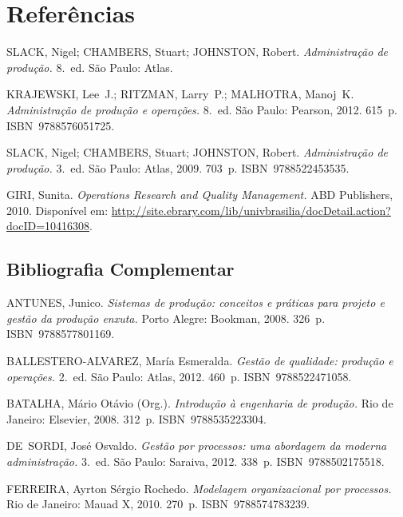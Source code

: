 \documentclass[12pt, a4paper]{article}
\begin{document}
\section*{Referências}

\begin{description}[leftmargin=0pt, labelwidth=0pt, itemsep=6pt]

  \item SLACK, Nigel; CHAMBERS, Stuart; JOHNSTON, Robert.
    \textit{Administração de produção.} 8.~ed. São Paulo: Atlas.

  \item KRAJEWSKI, Lee~J.; RITZMAN, Larry~P.; MALHOTRA, Manoj~K.
    \textit{Administração de produção e operações.} 8.~ed.
    São Paulo: Pearson, 2012. 615~p.
    ISBN~9788576051725.

  \item SLACK, Nigel; CHAMBERS, Stuart; JOHNSTON, Robert.
    \textit{Administração de produção.} 3.~ed.
    São Paulo: Atlas, 2009. 703~p.
    ISBN~9788522453535.

  \item GIRI, Sunita.
    \textit{Operations Research and Quality Management.}
    ABD Publishers, 2010.
    Disponível em: \url{http://site.ebrary.com/lib/univbrasilia/docDetail.action?docID=10416308}.

\end{description}

\subsection*{Bibliografia Complementar}

\begin{description}[leftmargin=0pt, labelwidth=0pt, itemsep=6pt]

  \item ANTUNES, Junico.
    \textit{Sistemas de produção: conceitos e práticas para projeto e gestão da produção enxuta.}
    Porto Alegre: Bookman, 2008. 326~p.
    ISBN~9788577801169.

  \item BALLESTERO-ALVAREZ, María Esmeralda.
    \textit{Gestão de qualidade: produção e operações.}
    2.~ed. São Paulo: Atlas, 2012. 460~p.
    ISBN~9788522471058.

  \item BATALHA, Mário Otávio (Org.).
    \textit{Introdução à engenharia de produção.}
    Rio de Janeiro: Elsevier, 2008. 312~p.
    ISBN~9788535223304.

  \item DE~SORDI, José Osvaldo.
    \textit{Gestão por processos: uma abordagem da moderna administração.}
    3.~ed. São Paulo: Saraiva, 2012. 338~p.
    ISBN~9788502175518.

  \item FERREIRA, Ayrton Sérgio Rochedo.
    \textit{Modelagem organizacional por processos.}
    Rio de Janeiro: Mauad X, 2010. 270~p.
    ISBN~9788574783239.

\end{description}
\end{document}
